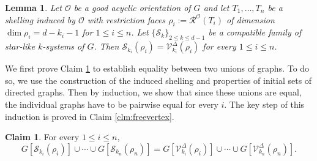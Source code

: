 \documentclass[11pt,twoside]{article}
\newtheorem{lemma}[theorem]{Lemma}
\theoremstyle{definition}
\newtheorem{claim}{Claim}[theorem]
\newcommand{\cS}{\mathcal{S}}
\newcommand{\cO}{\mathcal{O}}
\newcommand{\cV}{\mathcal{V}}
\newcommand{\cR}{\mathcal{R}}
\begin{document}
\begin{lemma}\label{lem:restriction}
Let $\cO$ be a good acyclic orientation of $G$ and let $T_1, \dots, T_n$ be a shelling induced by $\cO$ with restriction faces $\rho_i := \cR^\cO(T_i)$ of dimension $\dim \rho_i = d - k_i - 1$ for $1 \le i \le n$. Let $\{\cS_k\}_{2 \le k \le d-1}$ be a compatible family of star-like $k$-systems of $G$. Then $\cS_{k_i}(\rho_i) = \cV^\Delta_{k_i}(\rho_i)$ for every $1 \le i \le n$. 
\end{lemma}

We first prove Claim \ref{clm:initial} to establish equality between two unions of graphs. To do so, we use the construction of the induced shelling and properties of initial sets of directed graphs. Then by induction, we show that since these unions are equal, the individual graphs have to be pairwise equal for every $i$. The key step of this induction is proved in Claim \ref{clm:freevertex}. 

\begin{claim}\label{clm:initial}
For every $1 \le i \le n$, 
\begin{equation}\label{eqn:initialset}
   G[\cS_{k_i}(\rho_i)] \cup \cdots \cup G[\cS_{k_n}(\rho_n)] = G[\cV^\Delta_{k_i}(\rho_i)] \cup \cdots \cup G[\cV^\Delta_{k_n}(\rho_n)].
\end{equation}
\end{claim}
\end{document}
